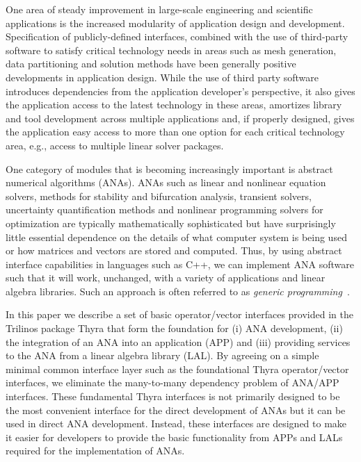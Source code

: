 \documentclass[pdf,ps2pdf,11pt]{SANDreport}
\begin{document}
One area of steady improvement in large-scale engineering and
scientific applications is the increased modularity of application
design and development.  Specification of publicly-defined interfaces,
combined with the use of third-party software to satisfy critical
technology needs in areas such as mesh generation, data partitioning
and solution methods have been generally positive developments in
application design.  While the use of third party software introduces
dependencies from the application developer's perspective, it also
gives the application access to the latest technology in these areas,
amortizes library and tool development across multiple applications
and, if properly designed, gives the application easy access to more
than one option for each critical technology area, e.g., access to
multiple linear solver packages.

One category of modules that is becoming increasingly important is abstract
numerical algorithms (ANAs).  ANAs such as linear and nonlinear equation
solvers, methods for stability and bifurcation analysis, transient solvers,
uncertainty quantification methods and nonlinear programming solvers for
optimization are typically mathematically sophisticated but have surprisingly
little essential dependence on the details of what computer system is being
used or how matrices and vectors are stored and computed.  Thus, by using
abstract interface capabilities in languages such as C++, we can implement ANA
software such that it will work, unchanged, with a variety of applications and
linear algebra libraries.  Such an approach is often referred to as {\it
generic programming}~\cite{ref:boost_generic_programming}.

In this paper we describe a set of basic operator/vector interfaces provided
in the Trilinos package Thyra that form the foundation for (i) ANA
development, (ii) the integration of an ANA into an application (APP) and
(iii) providing services to the ANA from a linear algebra library (LAL).  By
agreeing on a simple minimal common interface layer such as the foundational
Thyra operator/vector interfaces, we eliminate the many-to-many dependency
problem of ANA/APP interfaces.  These fundamental Thyra interfaces is not
primarily designed to be the most convenient interface for the direct
development of ANAs but it can be used in direct ANA development.  Instead,
these interfaces are designed to make it easier for developers to provide the
basic functionality from APPs and LALs required for the implementation of
ANAs.
\end{document}

